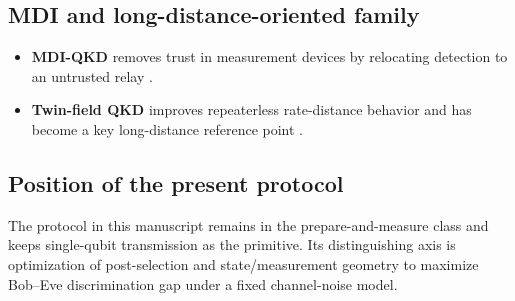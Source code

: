 \subsection{MDI and long-distance-oriented family}
\begin{itemize}
    \item \textbf{MDI-QKD} removes trust in measurement devices by relocating detection to an untrusted relay \cite{LoCurtyQi2012}.
    \item \textbf{Twin-field QKD} improves repeaterless rate-distance behavior and has become a key long-distance reference point \cite{rate_distance}.
\end{itemize}

\subsection{Position of the present protocol}
The protocol in this manuscript remains in the prepare-and-measure class and keeps single-qubit transmission as the primitive. Its distinguishing axis is optimization of post-selection and state/measurement geometry to maximize Bob--Eve discrimination gap under a fixed channel-noise model.
